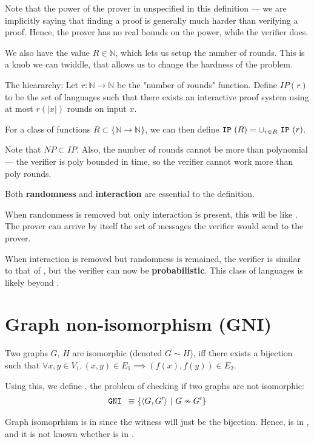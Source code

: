 Note that the power of the prover in unspecified in this definition ---
we are implicitly saying that finding a proof is generally much harder
than verifying a proof. Hence, the prover has no real bounds on the power,
while the verifier does.

We also have the value $R \in \mathbb{N}$, which lets us setup the number
of rounds. This is a knob we can twiddle, that allows us to change the hardness
of the problem.



\begin{definition}
The \ip hieararchy: Let $r: \mathbb{N} \to \mathbb{N}$ be the "number of rounds" function.
Define $IP(r)$ to be the set of languages such that there exists an interactive
proof system using at most $r(|x|)$ rounds on input $x$.

For a class of functions $R \subset \{ \mathbb{N} \to \mathbb{N} \}$, we can then define $\texttt{IP}~(R) = \cup_{r \in R} ~\texttt{IP}~(r)$.
\end{definition}

Note that $NP \subset IP$.  Also, the number of rounds cannot be more than 
polynomial --- the verifier is poly bounded in time, so the verifier
cannot work more than poly rounds.

Both \textbf{randomness} and \textbf{interaction} are essential to the definition.


When randomness is removed but only interaction is present, this will be
like \nptime. The prover can arrive by itself the set of messages the
verifier would send to the prover.


When interaction is removed but randomness is remained, the verifier is
similar to that of \nptime, but the verifier can now be \textbf{probabilistic}.
This class of languages is likely beyond \nptime.

\section{Graph non-isomorphism (GNI)}
Two graphs $G$, $H$ are isomorphic (denoted $G \sim H$), iff there exists
a bijection such that $\forall x, y \in V_1, (x, y) \in E_1 \implies (f(x), f(y)) \in E_2$.

Using this, we define \gni, the problem of checking if two graphs
are not isomorphic:
\begin{align*}
\texttt{GNI } \equiv \{ \langle G, G' \rangle ~\vert~ G \nsim G' \}
\end{align*}

Graph isomoprhism is in \nptime since the witness will just be the bijection.
Hence, \gni is in \conptime, and it is not known whether \gni is in \nptime.

